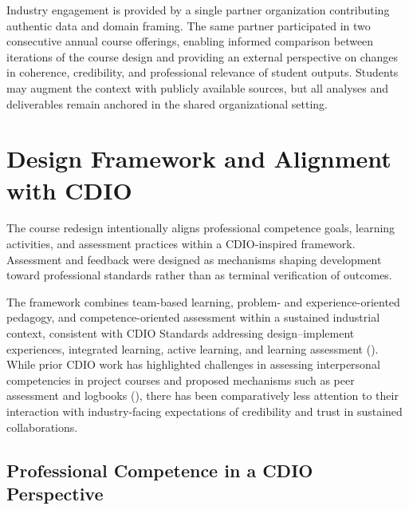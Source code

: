 Industry engagement is provided by a single partner organization contributing authentic data and domain framing. The same partner participated in two consecutive annual course offerings, enabling informed comparison between iterations of the course design and providing an external perspective on changes in coherence, credibility, and professional relevance of student outputs. Students may augment the context with publicly available sources, but all analyses and deliverables remain anchored in the shared organizational setting.



\section{Design Framework and Alignment with CDIO}

The course redesign intentionally aligns professional competence goals, learning activities, and assessment practices within a CDIO-inspired framework. 
Assessment and feedback were designed as mechanisms shaping development toward professional standards rather than as terminal verification of outcomes.

The framework combines team-based learning, problem- and experience-oriented pedagogy, and competence-oriented assessment within a sustained industrial context, consistent with CDIO Standards addressing design--implement experiences, integrated learning, active learning, and learning assessment (\cite{malmqvist2020standards3}).
While prior CDIO work has highlighted challenges in assessing interpersonal competencies in project courses and proposed mechanisms such as peer assessment and logbooks (\cite{hansen2023assessment, spooner2008teamwork, junaid2018logbook}), there has been comparatively less attention to their interaction with industry-facing expectations of credibility and trust in sustained collaborations.

\subsection{Professional Competence in a CDIO Perspective}

